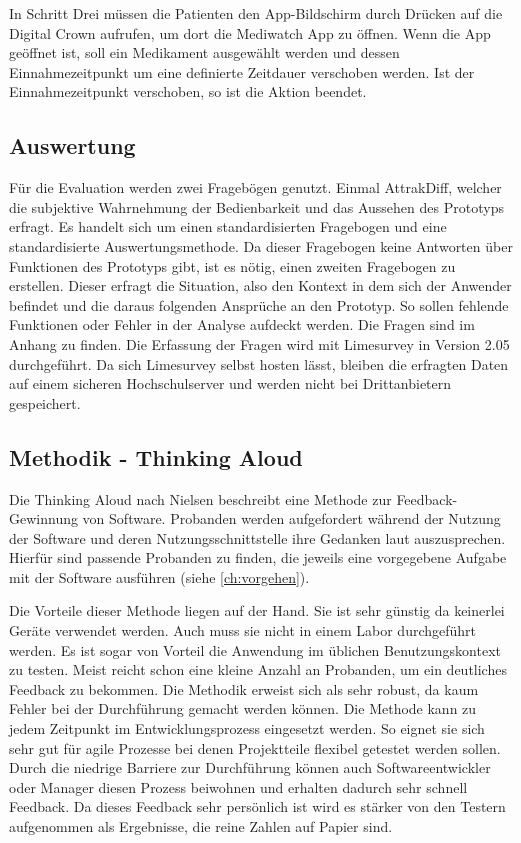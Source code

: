 In Schritt Drei müssen die Patienten den App-Bildschirm durch Drücken auf die Digital Crown aufrufen, um dort die Mediwatch App zu öffnen. Wenn die App geöffnet ist, soll ein Medikament ausgewählt werden und dessen Einnahmezeitpunkt um eine definierte Zeitdauer verschoben werden. Ist der Einnahmezeitpunkt verschoben, so ist die Aktion beendet.

\subsection{Auswertung}
Für die Evaluation werden zwei Fragebögen genutzt. Einmal AttrakDiff\cite{UserInDe:Attrakdiff}, welcher die subjektive  Wahrnehmung der Bedienbarkeit und das Aussehen des Prototyps erfragt. Es handelt sich um einen standardisierten Fragebogen und eine standardisierte Auswertungsmethode. Da dieser Fragebogen keine Antworten über Funktionen des Prototyps gibt, ist es nötig, einen zweiten Fragebogen zu erstellen. Dieser erfragt die Situation, also den Kontext in dem sich der Anwender befindet und die daraus folgenden Ansprüche an den Prototyp. So sollen fehlende Funktionen oder Fehler in der Analyse aufdeckt werden. Die Fragen sind im Anhang zu finden.
Die Erfassung der Fragen wird mit Limesurvey\cite{Limesurvey} in Version 2.05 durchgeführt. Da sich Limesurvey selbst hosten lässt, bleiben die erfragten Daten auf einem sicheren Hochschulserver und werden nicht bei Drittanbietern gespeichert. 

\subsection{Methodik - Thinking Aloud}
\label{ch:thinking}
Die Thinking Aloud nach Nielsen \cite{Nielsen:1993aa} beschreibt eine Methode zur Feedback-Gewinnung von Software. Probanden werden aufgefordert während der Nutzung der Software und deren Nutzungsschnittstelle ihre Gedanken laut auszusprechen. Hierfür sind passende Probanden zu finden, die jeweils eine vorgegebene Aufgabe mit der Software ausführen (siehe \ref{ch:vorgehen}).

Die Vorteile dieser Methode liegen auf der Hand. Sie ist sehr günstig da keinerlei Geräte verwendet werden. Auch muss sie nicht in einem Labor durchgeführt werden. Es ist sogar von Vorteil die Anwendung im üblichen Benutzungskontext zu testen. Meist reicht schon eine kleine Anzahl an Probanden, um ein deutliches Feedback zu bekommen. Die Methodik erweist sich als sehr robust, da kaum Fehler bei der Durchführung gemacht werden können. Die Methode kann zu jedem Zeitpunkt im Entwicklungsprozess eingesetzt werden. So eignet sie sich sehr gut für agile Prozesse bei denen Projektteile flexibel getestet werden sollen. Durch die niedrige Barriere zur Durchführung können auch Softwareentwickler oder Manager diesen Prozess beiwohnen und erhalten dadurch sehr schnell Feedback. Da dieses Feedback sehr persönlich ist wird es stärker von den Testern aufgenommen als Ergebnisse, die reine Zahlen auf Papier sind.

